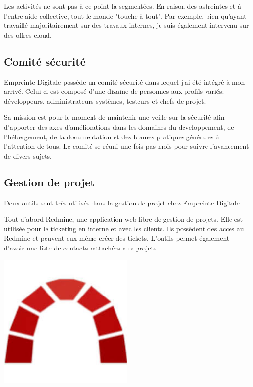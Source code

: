 \documentclass[12pt, a4paper, twoside]{article}
\begin{document}
Les activités ne sont pas à ce point-là segmentées. 
En raison des astreintes et à l'entre-aide collective, tout le monde "touche à tout". 
Par exemple, bien qu'ayant travaillé majoritairement sur des travaux internes, je suis également intervenu sur des offres cloud. \\

\subsection{Comité sécurité}
Empreinte Digitale possède un comité sécurité dans lequel j'ai été intégré à mon arrivé.
Celui-ci est composé d'une dizaine de personnes aux profils variés: développeurs, administrateurs systèmes, testeurs et chefs de projet.

Sa mission est pour le moment de maintenir une veille sur la sécurité afin d'apporter des axes d'améliorations dans les domaines du développement, de l'hébergement, de la documentation et des bonnes pratiques générales à l'attention de tous. 
Le comité se réuni une fois pas mois pour suivre l'avancement de divers sujets.

\newpage
\subsection{Gestion de projet}
Deux outils sont très utilisés dans la gestion de projet chez Empreinte Digitale. \\

\noindent%
\begin{minipage}{.7\textwidth}%
Tout d'abord \gls{Redmine}, une application web libre de gestion de projets.
Elle est utilisée pour le ticketing en interne et avec les clients.
Ils possèdent des accès au \gls{Redmine} et peuvent eux-même créer des tickets.
L'outils permet également d'avoir une liste de contacts rattachées aux projets. \\
\end{minipage}%
\hfill
\begin{minipage}{.3\textwidth}%
\begin{center}
\includegraphics[width=0.5\textwidth]{src/logo_redmine.jpeg}
\end{center}
\end{minipage}%
\end{document}
